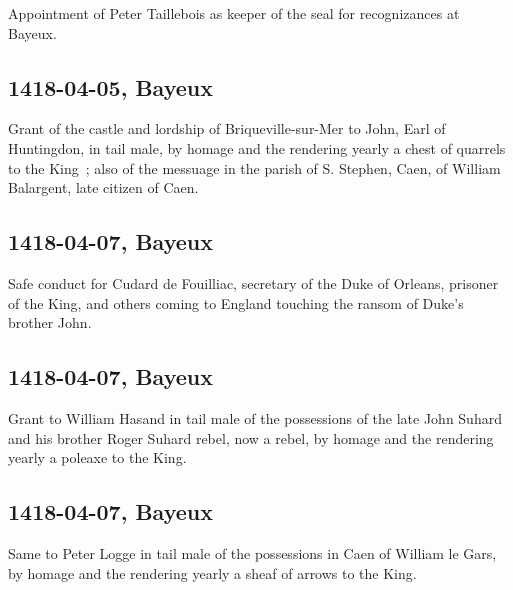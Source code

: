 \documentclass[a4paper,12pt,twoside]{book}
\begin{document}
                
                  Appointment of Peter Taillebois as keeper of the seal for recognizances at Bayeux.
               
                
                \subsection{1418-04-05, Bayeux}
                
                
                  Grant of the castle and lordship of Briqueville-sur-Mer to John, Earl of Huntingdon, in tail male, by homage and the rendering yearly a chest of quarrels to the King ; also of the messuage in the parish of S. Stephen, Caen, of William Balargent, late citizen of Caen.
               
                
                \subsection{1418-04-07, Bayeux}
                
                
                     Safe conduct for Cudard de Fouilliac, secretary of the Duke of Orleans, prisoner of the King, and others coming to England touching the ransom of Duke's brother John.
                  
                
                \subsection{1418-04-07, Bayeux}
                
                
                     Grant to William Hasand in tail male of the possessions of the late John Suhard and his brother Roger Suhard rebel, now a rebel, by homage and the rendering yearly a poleaxe to the King.
                  
                
                \subsection{1418-04-07, Bayeux}
                
                
                     Same to Peter Logge in tail male of the possessions in Caen of William le Gars, by homage and the rendering yearly a sheaf of arrows to the King.
                  
\end{document}
